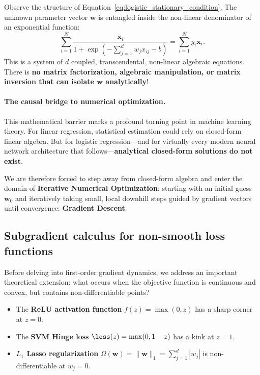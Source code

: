 Observe the structure of Equation~\eqref{eq:logistic_stationary_condition}. The unknown parameter vector $\mathbf{w}$ is entangled inside the non-linear denominator of an exponential function:
\begin{equation}
\sum_{i=1}^N \frac{\mathbf{x}_i}{1 + \exp\left(-\sum_{j=1}^d w_j x_{ij} - b\right)} = \sum_{i=1}^N y_i \mathbf{x}_i.
\end{equation}
This is a system of $d$ coupled, transcendental, non-linear algebraic equations. There is \textbf{no matrix factorization, algebraic manipulation, or matrix inversion that can isolate $\mathbf{w}$ analytically}!

\paragraph{The causal bridge to numerical optimization.}
This mathematical barrier marks a profound turning point in machine learning theory. For linear regression, statistical estimation could rely on closed-form linear algebra. But for logistic regression—and for virtually every modern neural network architecture that follows—\textbf{analytical closed-form solutions do not exist}.

We are therefore forced to step away from closed-form algebra and enter the domain of \textbf{Iterative Numerical Optimization}: starting with an initial guess $\mathbf{w}_0$ and iteratively taking small, local downhill steps guided by gradient vectors until convergence: \textbf{Gradient Descent}.

\subsection{Subgradient calculus for non-smooth loss functions}
\label{sec:subgradient_calculus}

Before delving into first-order gradient dynamics, we address an important theoretical extension: what occurs when the objective function is continuous and convex, but contains non-differentiable points?
\begin{itemize}[noitemsep]
  \item The \textbf{ReLU activation function} $f(z) = \max(0, z)$ has a sharp corner at $z = 0$.
  \item The \textbf{SVM Hinge loss} $\loss(z) = \max(0, 1 - z)$ has a kink at $z = 1$.
  \item \textbf{$L_1$ Lasso regularization} $\Omega(\mathbf{w}) = \|\mathbf{w}\|_1 = \sum_{j=1}^d |w_j|$ is non-differentiable at $w_j = 0$.
\end{itemize}


